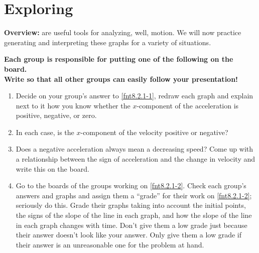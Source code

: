 \section{Exploring \motiongraphs{}}
\label{act8.2.2}

\begin{overview}

\textbf{Overview:} \motiongraphs{} are useful tools for analyzing, well, motion. We will now practice generating and interpreting these graphs for a variety of situations.

\end{overview}

\begin{fnt}
	
\end{fnt}

\begin{fnt}
	
\end{fnt}

\begin{fnt}
	
\end{fnt}

%	

\begin{center}\noindent\textbf{Each group is responsible for putting one of the following on the board.\\ Write so that all other groups can easily follow your presentation!}\end{center}

\noindent{}

	\begin{enumerate}
		\item Decide on your group's answer to \ref{fnt8.2.1-1}, redraw each graph and explain next to it how you know whether the $x$-component of the acceleration is positive, negative, or zero.
		\item In each case, is the $x$-component of the velocity positive or negative?
		\item Does a negative acceleration always mean a decreasing speed? Come up with a relationship between the sign of acceleration and the change in velocity and write this on the board.
		\item Go to the boards of the groups working on \ref{fnt8.2.1-2}. Check each group's answers and graphs and assign them a ``grade'' for their work on \ref{fnt8.2.1-2}; seriously do this. Grade their graphs taking into account the initial points, the signs of the slope of the line in each graph, and how the slope of the line in each graph changes with time. Don't give them a low grade just because their answer doesn't look like your answer. Only give them a low grade if their answer is an unreasonable one for the problem at hand.
	\end{enumerate}
	

